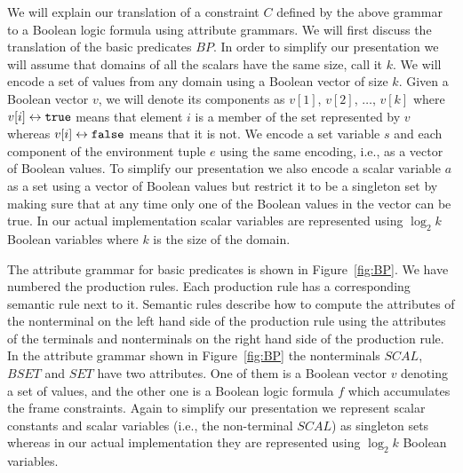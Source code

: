 We will explain our translation of a constraint $C$ defined by the
above grammar to a Boolean logic formula using attribute grammars.  We
will first discuss the translation of the basic predicates $BP$.  In
order to simplify our presentation we will assume that domains of all
the scalars have the same size, call it $k$.  We will encode a set of
values from any domain using a Boolean vector of size $k$.  Given a
Boolean vector $v$, we will denote its components as $v[1]$, $v[2]$,
$\dots$, $v[k]$ where $v[i] \leftrightarrow \texttt{true}$ means that element $i$ is a
member of the set represented by $v$ whereas $v[i] \leftrightarrow \texttt{false}$ means
that it is not.  We encode a set variable $s$ and each component of
the environment tuple $e$ using the same encoding, i.e., as a vector
of Boolean values.  To simplify our presentation we also encode a
scalar variable $a$ as a set using a vector of Boolean values but
restrict it to be a singleton set by making sure that at any time only
one of the Boolean values in the vector can be true.  In our actual
implementation scalar variables are represented using $\log_2 k$
Boolean variables where $k$ is the size of the domain.

The attribute grammar for basic predicates is shown in
Figure~\ref{fig:BP}.  We have numbered the production rules.  Each
production rule has a corresponding semantic rule next to it.
Semantic rules describe how to compute the attributes of the
nonterminal on the left hand side of the production rule using the
attributes of the terminals and nonterminals on the right hand side of
the production rule.  In the attribute grammar shown in
Figure~\ref{fig:BP} the nonterminals $SCAL$, $BSET$ and $SET$ have two
attributes.  One of them is a Boolean vector $v$ denoting a set of
values, and the other one is a Boolean logic formula $f$ which
accumulates the frame constraints.  Again to simplify our presentation
we represent scalar constants and scalar variables (i.e., the
non-terminal $SCAL$) as singleton sets whereas in our actual
implementation they are represented using $\log_2 k$ Boolean
variables.

